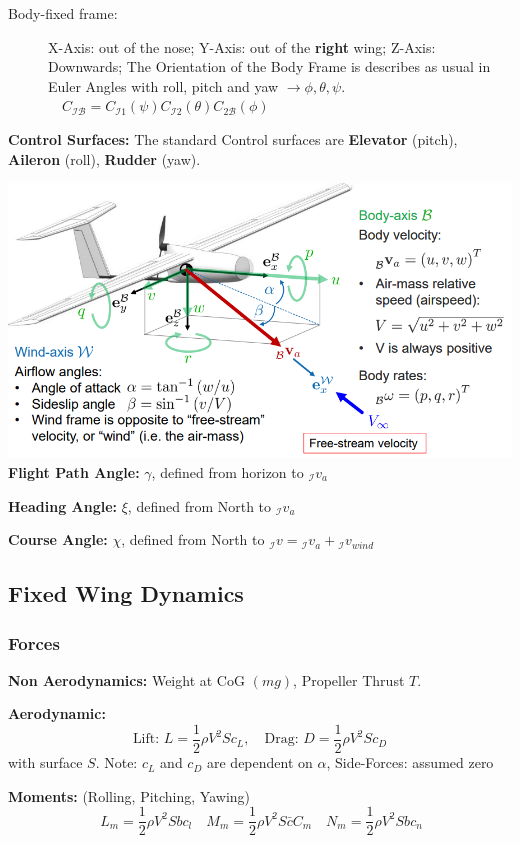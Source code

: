 \documentclass[fontsize=6pt,DIV=calc,a4paper,ngerman]{scrartcl}
\begin{document}
\begin{multicols*}{4}
\begin{description}
		\item[Body-fixed frame:]X-Axis: out of the nose;
		      Y-Axis: out of the \textbf{right} wing;
		      Z-Axis: Downwards; The Orientation of the Body Frame is describes as usual in Euler Angles with roll, pitch and yaw $\rightarrow \phi, \theta,\psi$.
			  $\quad C_\mathcal{IB} = C_{\mathcal{I}1}(\psi)C_{\mathcal{I}2}(\theta)C_{2\mathcal{B}}(\phi)$
	\end{description}

	\textbf{Control Surfaces:} The standard Control surfaces are \textbf{Elevator} (pitch), \textbf{Aileron} (roll), \textbf{Rudder} (yaw).

	\includegraphics[width=0.8\linewidth]{Fixedwing_kin.png}\\

	\textbf{Flight Path Angle:} $\gamma$, defined from horizon to ${}_\mathcal{I}v_a$

	\textbf{Heading Angle:} $\xi$, defined from North to ${}_\mathcal{I}v_a$

	\textbf{Course Angle:} $\chi$, defined from North to ${}_\mathcal{I}v = {}_\mathcal{I}v_a + {}_\mathcal{I}v_{wind}$

	\subsection{Fixed Wing Dynamics}
	\subsubsection{Forces}

	\textbf{Non Aerodynamics:} Weight at CoG $(mg)$, Propeller Thrust $T$.

	\textbf{Aerodynamic:} 
	$$\text{Lift: }L=\frac{1}{2}\rho V^2Sc_L, \quad \text{Drag: } D=\frac{1}{2}\rho V^2Sc_D $$ with surface $S$.
	Note: $c_L$ and $c_D$ are dependent on $\alpha$, Side-Forces: assumed zero

	\textbf{Moments:} (Rolling, Pitching, Yawing)
	$$\ L_m = \frac{1}{2} \rho V^2 S b c_l  \quad M_m = \frac{1}{2} \rho V^2 S \bar{c} C_m \quad  N_m = \frac{1}{2} \rho V^2 S b c_n$$


\end{multicols*}
\end{document}
